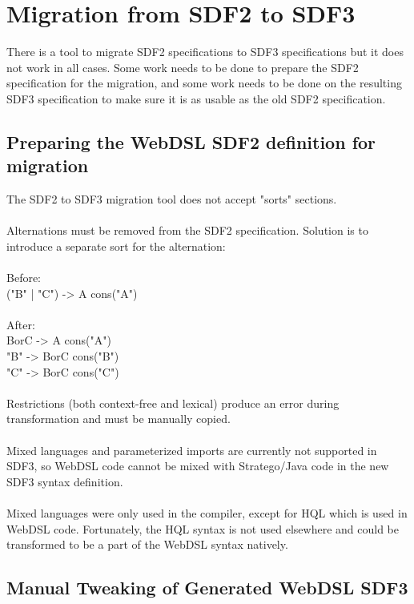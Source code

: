   \section{\label{sec:sdf2-to-sdf3}Migration from SDF2 to SDF3}

    There is a tool to migrate SDF2 specifications to SDF3 specifications but it does not work in all cases. Some work needs to be done to prepare the SDF2 specification for the migration, and some work needs to be done on the resulting SDF3 specification to make sure it is as usable as the old SDF2 specification.

    \subsection{\label{subsec:preparing-webdsl-sdf2}Preparing the WebDSL SDF2 definition for migration}

      The SDF2 to SDF3 migration tool does not accept "sorts" sections.
      \\\\Alternations must be removed from the SDF2 specification. Solution is to introduce a separate sort for the alternation:
      \\\\Before:
      \\("B" | "C") -> A {cons("A")}
      \\\\After:
      \\BorC -> A    {cons("A")}
      \\"B"  -> BorC {cons("B")}
      \\"C"  -> BorC {cons("C")}
      \\\\Restrictions (both context-free and lexical) produce an error during transformation and must be manually copied.
      \\\\Mixed languages and parameterized imports are currently not supported in SDF3, so WebDSL code cannot be mixed with Stratego/Java code in the new SDF3 syntax definition.
      \\\\Mixed languages were only used in the compiler, except for HQL which is used in WebDSL code. Fortunately, the HQL syntax is not used elsewhere and could be transformed to be a part of the WebDSL syntax natively.

    \subsection{\label{subsec:manual-tweaking-sdf3}Manual Tweaking of Generated WebDSL SDF3}

